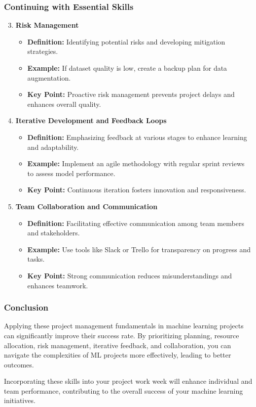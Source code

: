 \documentclass[aspectratio=169]{beamer}
\begin{document}
\begin{frame}[fragile]
    \frametitle{Continuing with Essential Skills}
    \begin{enumerate}
        \setcounter{enumi}{2} %
        \item \textbf{Risk Management}
            \begin{itemize}
                \item \textbf{Definition:} Identifying potential risks and developing mitigation strategies.
                \item \textbf{Example:} If dataset quality is low, create a backup plan for data augmentation.
                \item \textbf{Key Point:} Proactive risk management prevents project delays and enhances overall quality.
            \end{itemize}
        \item \textbf{Iterative Development and Feedback Loops}
            \begin{itemize}
                \item \textbf{Definition:} Emphasizing feedback at various stages to enhance learning and adaptability.
                \item \textbf{Example:} Implement an agile methodology with regular sprint reviews to assess model performance.
                \item \textbf{Key Point:} Continuous iteration fosters innovation and responsiveness.
            \end{itemize}
        \item \textbf{Team Collaboration and Communication}
            \begin{itemize}
                \item \textbf{Definition:} Facilitating effective communication among team members and stakeholders.
                \item \textbf{Example:} Use tools like Slack or Trello for transparency on progress and tasks.
                \item \textbf{Key Point:} Strong communication reduces misunderstandings and enhances teamwork.
            \end{itemize}
    \end{enumerate}
\end{frame}

\begin{frame}[fragile]
    \frametitle{Conclusion}
    Applying these project management fundamentals in machine learning projects can significantly improve their success rate. By prioritizing planning, resource allocation, risk management, iterative feedback, and collaboration, you can navigate the complexities of ML projects more effectively, leading to better outcomes.
    
    Incorporating these skills into your project work week will enhance individual and team performance, contributing to the overall success of your machine learning initiatives.
\end{frame}
\end{document}
